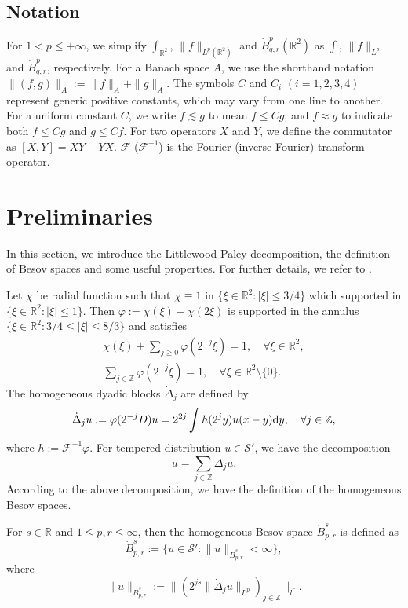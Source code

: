 \documentclass[reqno]{amsart}
\begin{document}
\subsection*{Notation} For $1< p\leqslant+\infty$, we simplify $\int_{\mathbb{R}^2}$,
$\|f\|_{L^p(\mathbb{R}^2)}$ and $\dot{B}^p_{q,r}(\mathbb{R}^2)$ as
$\int$, $\|f\|_{L^p}$ and $\dot{B}^p_{q,r}$, respectively. For a Banach space $A$, we use the
shorthand notation $\|(f,g)\|_A:=\|f\|_A+\|g\|_A$.
 The symbols $C$ and $C_i$ $(i=1,2,3,4)$ represent generic positive constants, which may vary
 from one line to another. For a uniform constant $C$, we write $f\lesssim g$ to mean $f\leqslant Cg$,
 and $f\approx g$ to indicate both $f\leqslant Cg$ and $g\leqslant Cf$. For two operators $X$ and $Y$, we define the commutator as $[X,Y]=XY-YX$. $\mathcal{F}$ ($\mathcal{F}^{-1}$) is the Fourier (inverse Fourier) transform operator.


\section{Preliminaries}\label{subsec:02}

In this section, we introduce the Littlewood-Paley decomposition, the definition of
Besov spaces and some useful properties. For further details, we refer to
\cite{MR2768550}.

Let $\chi$ be radial function such that $\chi\equiv1$ in
$\{\xi\in\mathbb{R}^2:|\xi|\leqslant 3/4\}$ which supported in
$\{\xi\in\mathbb{R}^2:|\xi|\leqslant 1\}$. Then $\varphi:=\chi(\xi)-\chi(2\xi)$
is supported in the annulus $\{\xi\in\mathbb{R}^2:3/4\leqslant|\xi|\leqslant 8/3\}$
and satisfies
\begin{gather*}
 \chi(\xi)+\sum_{j\geqslant 0}\varphi(2^{-j}\xi)=1,\quad \forall\xi\in\mathbb{R}^2,\\
 \sum_{j\in\mathbb{Z}}\varphi(2^{-j}\xi)=1,\quad \forall\xi\in\mathbb{R}^2\setminus \{0\}.
\end{gather*}
The homogeneous dyadic blocks $\dot{\Delta}_j$ are defined by
\[
 \dot{\Delta}_ju:=\varphi(2^{-j}D)u=2^{2j}\int h(2^jy)u(x-y){\rm d}y,\quad
 \forall j\in\mathbb{Z},
\]
where $h:=\mathcal{F}^{-1}\varphi$. For tempered distribution $u\in \mathcal{S}'$,
 we have the decomposition
\[
 u=\sum_{j\in\mathbb{Z}}\dot{\Delta}_ju.
\]
According to the above decomposition, we have the definition of the homogeneous Besov
spaces.
\begin{definition}\label{def2.1} \rm
 For $s\in\mathbb{R}$ and $1\leqslant p,r\leqslant\infty$, then the homogeneous
Besov space $\dot{B}^s_{p,r}$ is defined as
\[
 \dot{B}^s_{p,r}:=\{u\in\mathcal{S}':\|u\|_{\dot{B}^s_{p,r}}<\infty\},
\]
 where
\[
 \|u\|_{\dot{B}^s_{p,r}}:=\|(2^{js}\|\dot{\Delta}_ju\|_{L^p})_{j\in\mathbb{Z}}\|_{l^r}.
\]
\end{definition}
\end{document}
